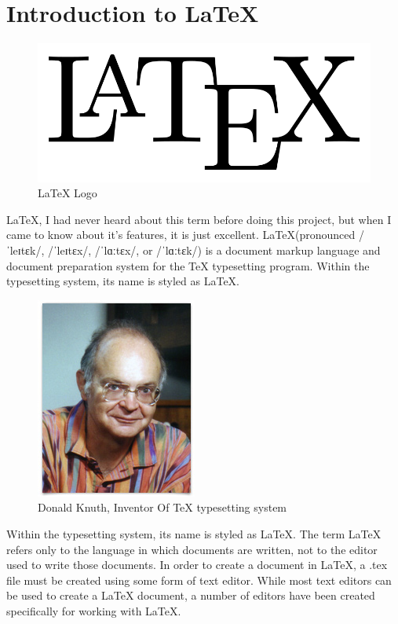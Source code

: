 \section{Introduction to \LaTeX}
\begin{figure}[ht]
\centering
\includegraphics[scale=0.2]{images/latex.png}
\caption{\LaTeX{} Logo}
\end{figure}
\hspace{-1.8em} \LaTeX{}, I had never heard about this term before doing this project,
but when I came to know about it's features, it is just excellent. 
\LaTeX (pronounced /ˈleɪtɛk/, /ˈleɪtɛx/, /ˈlɑːtɛx/, or /ˈlɑːtɛk/) is a 
document markup language and document preparation system for the \TeX{} 
typesetting  program. Within the typesetting system, its name is styled 
as \LaTeX.
\begin{figure}[ht]
\centering
\includegraphics[scale=0.4]{images/donald.jpg}
\caption{Donald Knuth, Inventor Of \TeX{} typesetting system}
\end{figure}

\hspace{-1.8em} Within the typesetting system, its name is styled as \LaTeX. The term 
\LaTeX{} refers only to the language in which documents are written, 
not to the editor used to write those documents. In order to create a 
document in \LaTeX, a .tex file must be created using some form of text 
editor. While most text editors can be used to create a \LaTeX{} document, 
a number of editors have been created specifically for working with \LaTeX.\\

